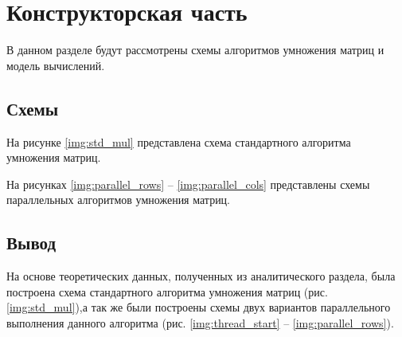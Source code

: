 \chapter{Конструкторская часть}

В данном разделе будут рассмотрены схемы алгоритмов умножения матриц и модель вычислений.

\section{Схемы}
На рисунке \ref{img:std_mul} представлена схема стандартного алгоритма умножения матриц.

\clearpage

На рисунках \ref{img:parallel_rows} -- \ref{img:parallel_cols} представлены схемы параллельных алгоритмов умножения матриц.


\clearpage


\clearpage


\clearpage


\clearpage


\section{Вывод}

На основе теоретических данных, полученных из аналитического раздела, была построена схема стандартного алгоритма умножения матриц (рис. \ref{img:std_mul}),а так же были построены схемы двух вариантов параллельного выполнения данного алгоритма (рис. \ref{img:thread_start} -- \ref{img:parallel_rows}).